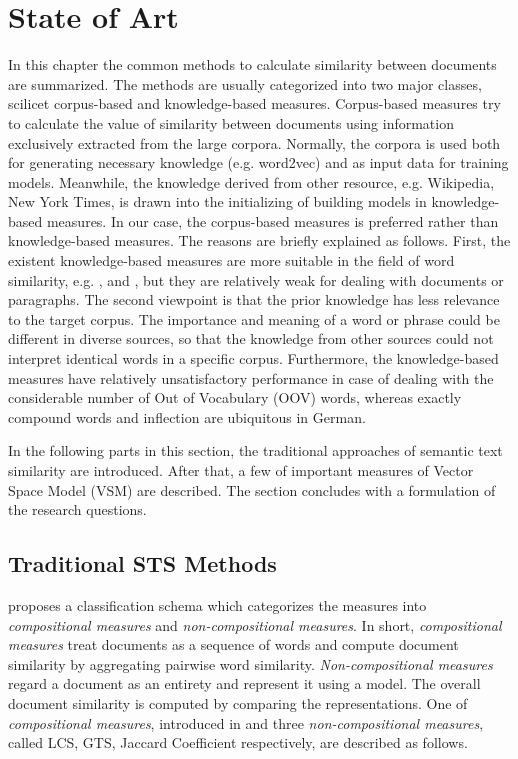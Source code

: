 \section{State of Art}
\label{sec:2}

In this chapter the common methods to calculate similarity between documents are summarized. The methods are usually categorized into two major classes, scilicet corpus-based and knowledge-based measures. Corpus-based measures try to calculate the value of similarity between documents using information exclusively extracted from the large corpora. Normally, the corpora is used both for generating necessary knowledge (e.g. word2vec) and as input data for training models. Meanwhile, the knowledge derived from other resource, e.g. Wikipedia, New York Times, is drawn into the initializing of building models in knowledge-based measures. In our case, the corpus-based measures is preferred rather than knowledge-based measures. The reasons are briefly explained as follows. First, the existent knowledge-based measures are more suitable in the field of word similarity, e.g. \cite{jiang1997semantic}, \cite{strube2006wikirelate} and \cite{Agirre2009ta}, but they are relatively weak for dealing with documents or paragraphs. The second viewpoint is that the prior knowledge has less relevance to the target corpus. The importance and meaning of a word or phrase could be different in diverse sources, so that the knowledge from other sources could not interpret identical words in a specific corpus. Furthermore, the knowledge-based measures have relatively unsatisfactory performance in case of dealing with the considerable number of Out of Vocabulary (OOV) words, whereas exactly compound words and inflection are ubiquitous in German.

In the following parts in this section, the traditional approaches of semantic text similarity are introduced. After that, a few of important measures of Vector Space Model (VSM) are described. The section concludes with a formulation of the research questions. 


\subsection{Traditional STS Methods}
\label{sec:2.1}

\cite{bar2013composite} proposes a classification schema which categorizes the measures into \textit{compositional measures} and \textit{non-compositional measures}. In short, \textit{compositional measures} treat documents as a sequence of words and compute document similarity by aggregating pairwise word similarity.  \textit{Non-compositional measures} regard a document as an entirety and represent it using a model. The overall document similarity is computed by comparing the representations. One of \textit{compositional measures}, introduced in \cite{islam2008semantic} and three \textit{non-compositional measures}, called LCS, GTS, Jaccard Coefficient respectively, are described as follows.

